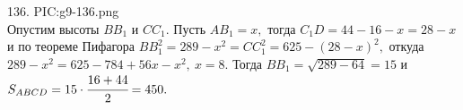136. {{PIC:g9-136.png}}\\
Опустим высоты $BB_1$ и $CC_1.$ Пусть $AB_1=x,$ тогда $C_1D=44-16-x=28-x$ и по теореме Пифагора $BB_1^2=289-x^2=CC_1^2=625-(28-x)^2,$ откуда
$289-x^2=625-784+56x-x^2,\ x=8.$ Тогда $BB_1=\sqrt{289-64}=15$ и $S_{ABCD}=15\cdot\cfrac{16+44}{2}=450.$\\
